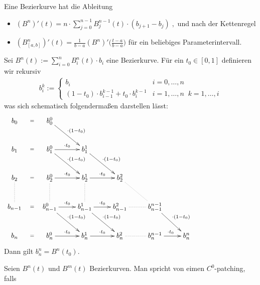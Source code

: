 \begin{Satz}
Eine Bezierkurve hat die Ableitung
\begin{itemize}
\item $(B^n)'(t) = n \cdot \sum_{j = 0}^{n-1} B_{j}^{n-1}(t) \cdot (b_{j+1} - b_j) \; ,$ und nach der Kettenregel
\item $(B^n_{[a,b]})'(t) = \frac{1}{b-a} (B^n)' \bigl(\frac{t -a}{b-a} \bigr)$  für ein beliebiges Parameterintervall.
\end{itemize}
\end{Satz}

\begin{Satz}
Sei $B^n(t) := \sum_{i = 0}^{n} B_i^n(t) \cdot  b_i$ eine Bezierkurve. Für ein 
$t_0 \in [0,1]$ definieren wir rekursiv  
\begin{align*}
b_i^k := \begin{cases}
b_i   & i= 0, \hdots,  n \\
(1-t_0) \cdot b_{i-1}^{k-1} + t_0 \cdot b_{i}^{k-1} &  i = 1, \hdots , n \; \;   k = 1, \hdots , i 
\end{cases} 
\end{align*}
was sich schematisch folgendermaßen darstellen lässt: 
\begin{align*}
\xymatrix{
b_0   \ar@{}[r]|-{=}  &  b_0^0 \ar[dr]^{\cdot(1-t_0)}  &  & & & & & &  \\
b_1   \ar@{}[r]|-{=}  &  b_1^0  \ar[r]^{\cdot t_0} \ar[dr]^{\cdot(1-t_0)} &   b_1^1  \ar[dr]^{\cdot(1-t_0)} & & & & & & \\
b_2   \ar@{}[r]|-{=}  \ar@{..}[d] &  b_2^0  \ar[r]^{\cdot t_0}  \ar@{..}[d] &   b_2^1 \ar[r]^{\cdot t_0}  \ar@{..}[d] &  b_2^2   \ar@{..}[dr]& & & & & \\
b_{n-1}   \ar@{}[r]|-{=}  &  b_{n-1}^0   \ar[r]^{\cdot t_0}  \ar[dr]^{\cdot(1-t_0)} &    b_{n-1}^1   \ar[r]^{\cdot t_0}  \ar[dr]^{\cdot(1-t_0)} &  b_{n-1}^2  \ar@{..}[r] &  
b_{n-1}^{n-1}  \ar[dr]^{\cdot(1-t_0)} & & & & \\
b_{n}   \ar@{}[r]|-{=}  &  b_{n}^0  \ar[r]^{\cdot t_0}  &    b_{n}^1   \ar[r]^{\cdot t_0}  &  b_{n}^2  \ar@{..}[r] & b_{n}^{n-1}   \ar[r]^{\cdot t_0}& b_{n}^{n}& & & 
}
\end{align*}
Dann gilt $b_n^n = B^n(t_0)$.
\end{Satz}

 



\begin{Definition}[Patching]
Seien $B^n(t)$ und $B^m(t)$  Bezierkurven. Man spricht von eimen $C^0$-patching, falls
 \end{Definition}


